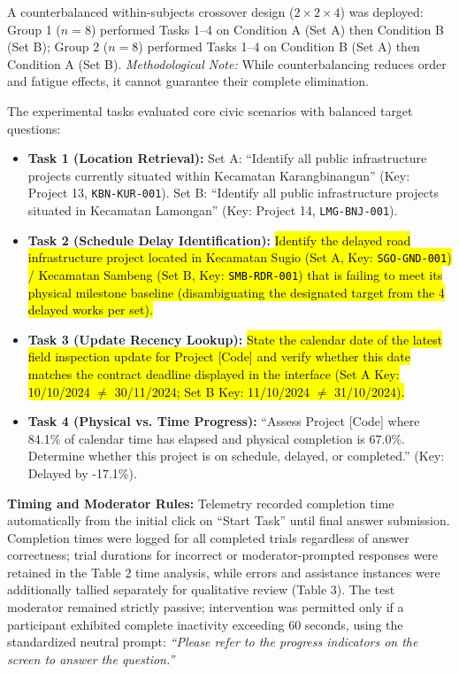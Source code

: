 \documentclass[runningheads]{llncs}
\begin{document}
A counterbalanced within-subjects crossover design ($2 \times 2 \times 4$) was deployed: Group 1 ($n=8$) performed Tasks 1--4 on Condition A (Set A) then Condition B (Set B); Group 2 ($n=8$) performed Tasks 1--4 on Condition B (Set A) then Condition A (Set B). \emph{Methodological Note:} While counterbalancing reduces order and fatigue effects, it cannot guarantee their complete elimination.

The experimental tasks evaluated core civic scenarios with balanced target questions:
\begin{itemize}\setlength{\itemsep}{1.2pt}\setlength{\parskip}{0pt}
    \item \textbf{Task 1 (Location Retrieval):} Set A: ``Identify all public infrastructure projects currently situated within Kecamatan Karangbinangun'' (Key: Project 13, \texttt{KBN-KUR-001}). Set B: ``Identify all public infrastructure projects situated in Kecamatan Lamongan'' (Key: Project 14, \texttt{LMG-BNJ-001}).
    \item \textbf{Task 2 (Schedule Delay Identification):} \hl{Identify the delayed road infrastructure project located in Kecamatan Sugio (Set A, Key: \texttt{SGO-GND-001}) / Kecamatan Sambeng (Set B, Key: \texttt{SMB-RDR-001}) that is failing to meet its physical milestone baseline (disambiguating the designated target from the 4 delayed works per set).}
    \item \textbf{Task 3 (Update Recency Lookup):} \hl{State the calendar date of the latest field inspection update for Project [Code] and verify whether this date matches the contract deadline displayed in the interface (Set A Key: 10/10/2024 $\neq$ 30/11/2024; Set B Key: 11/10/2024 $\neq$ 31/10/2024).}
    \item \textbf{Task 4 (Physical vs. Time Progress):} ``Assess Project [Code] where 84.1\% of calendar time has elapsed and physical completion is 67.0\%. Determine whether this project is on schedule, delayed, or completed.'' (Key: Delayed by -17.1\%).
\end{itemize}

\textbf{Timing and Moderator Rules:} Telemetry recorded completion time automatically from the initial click on ``Start Task'' until final answer submission. Completion times were logged for all completed trials regardless of answer correctness; trial durations for incorrect or moderator-prompted responses were retained in the Table 2 time analysis, while errors and assistance instances were additionally tallied separately for qualitative review (Table 3). The test moderator remained strictly passive; intervention was permitted only if a participant exhibited complete inactivity exceeding 60 seconds, using the standardized neutral prompt: \emph{``Please refer to the progress indicators on the screen to answer the question.''}
\end{document}

